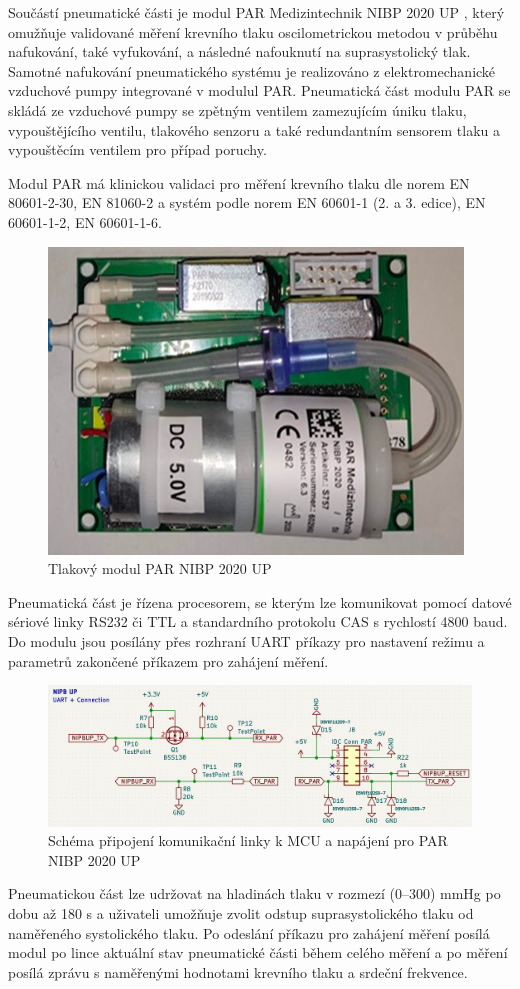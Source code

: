 Součástí pneumatické části je modul PAR Medizintechnik NIBP 2020 UP , který omužňuje validované měření krevního tlaku oscilometrickou metodou v průběhu nafukování, také vyfukování, a následné nafouknutí na suprasystolický tlak. Samotné nafukování pneumatického systému je realizováno z elektromechanické vzduchové pumpy integrované v modulul PAR.
Pneumatická část modulu PAR se skládá ze vzduchové pumpy se zpětným ventilem zamezujícím úniku tlaku, vypouštějícího ventilu, tlakového senzoru a také redundantním sensorem tlaku a vypouštěcím ventilem pro případ poruchy. \par
Modul PAR má klinickou validaci pro měření krevního tlaku dle norem EN 80601-2-30, EN 81060-2 a systém podle norem EN 60601-1 (2. a 3. edice), EN 60601-1-2, EN 60601-1-6.
\begin{figure}[H]
    \centering
    \includegraphics{pictures/par_nibp_up.jpg}
    \caption{Tlakový modul PAR NIBP 2020 UP}
    \label{fig:par_modul}
\end{figure}

Pneumatická část je řízena procesorem, se kterým lze komunikovat pomocí datové sériové linky RS232 či TTL a standardního protokolu CAS s rychlostí 4800 baud. Do modulu jsou posílány přes rozhraní UART příkazy pro nastavení režimu a parametrů zakončené příkazem pro zahájení měření.
\begin{figure}[H]
    \centering
    \includegraphics[width=0.9\linewidth]{pictures/nibpup_connection.jpg}
    \caption{Schéma připojení komunikační linky k MCU a napájení pro PAR NIBP 2020 UP }
    \label{fig:par_modul_comm}
\end{figure}
Pneumatickou část lze udržovat na hladinách tlaku v rozmezí (0–300) mmHg po dobu až 180 s a uživateli umožňuje zvolit odstup suprasystolického tlaku od naměřeného systolického tlaku. Po odeslání příkazu pro zahájení měření posílá modul po lince aktuální stav pneumatické části během celého měření a po měření posílá zprávu s naměřenými hodnotami krevního tlaku a srdeční frekvence.
